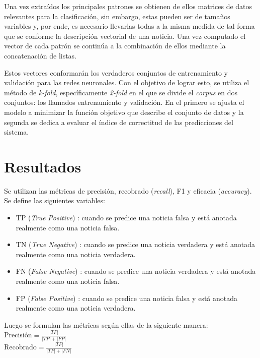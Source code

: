 \documentclass{llncs}
\begin{document}
\begin{multicols}{2}[]
Una vez extra\'idos los principales patrones se obtienen de ellos matrices de datos relevantes para la clasificaci\'on, sin embargo, estas pueden ser de tama\~nos variables y, por ende,
es necesario llevarlas todas a la misma medida de tal forma que se conforme la descripci\'on vectorial de una noticia. Una vez computado el vector de cada patr\'on se contin\'ua a la 
combinaci\'on de ellos mediante la concatenaci\'on de listas.

Estos vectores conformar\'an los verdaderos conjuntos de entrenamiento y validaci\'on para las redes neuronales. Con el objetivo de lograr esto, se utiliza el m\'etodo de \textit{k-fold},
espec\'ificamente \textit{2-fold} en el que se divide el \textit{corpus} en dos conjuntos: los llamados entrenamiento y validaci\'on. En el primero se ajusta el modelo a minimizar la funci\'on
objetivo que describe el conjunto de datos y la segunda se dedica a evaluar el \'indice de correctitud de las predicciones del sistema.

\section{Resultados}

Se utilizan las m\'etricas de precisi\'on, recobrado (\textit{recall}), F1 y eficacia (\textit{accuracy}). Se define las siguientes variables:

\begin{itemize}
\item TP (\textit{True Positive})		: cuando se predice una noticia falsa y est\'a anotada realmente como una noticia falsa.
\item TN (\textit{True Negative})		: cuando se predice una noticia verdadera y est\'a anotada realmente como una noticia verdadera.
\item FN (\textit{False Negative})	: cuando se predice una noticia verdadera y est\'a anotada realmente como una noticia falsa.
\item FP (\textit{False Positive})		: cuando se predice una noticia falsa y est\'a anotada realmente como una noticia verdadera.
\end{itemize}

Luego se formulan las m\'etricas seg\'un ellas de la siguiente manera:\\

Precisi\'on$ = \frac{|TP|}{|TP| + |FP|}$\\

Recobrado$ = \frac{|TP|}{|TP| + |FN|}$\\


\end{multicols}
\end{document}
